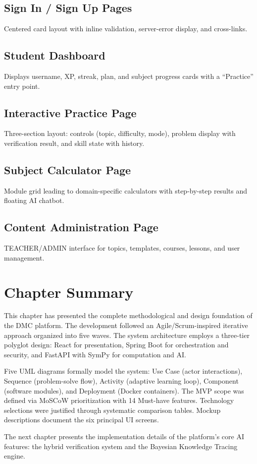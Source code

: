 \subsection{Sign In / Sign Up Pages} Centered card layout with inline validation, server-error display, and cross-links.

\subsection{Student Dashboard} Displays username, XP, streak, plan, and subject progress cards with a ``Practice'' entry point.

\subsection{Interactive Practice Page} Three-section layout: controls (topic, difficulty, mode), problem display with verification result, and skill state with history.

\subsection{Subject Calculator Page} Module grid leading to domain-specific calculators with step-by-step results and floating AI chatbot.

\subsection{Content Administration Page} TEACHER/ADMIN interface for topics, templates, courses, lessons, and user management.



\section{Chapter Summary}
\label{sec:ch5-summary}

This chapter has presented the complete methodological and design foundation of the DMC platform. The development followed an Agile/Scrum-inspired iterative approach organized into five waves. The system architecture employs a three-tier polyglot design: React for presentation, Spring Boot for orchestration and security, and FastAPI with SymPy for computation and AI.

Five UML diagrams formally model the system: Use Case (actor interactions), Sequence (problem-solve flow), Activity (adaptive learning loop), Component (software modules), and Deployment (Docker containers). The MVP scope was defined via MoSCoW prioritization with 14 Must-have features. Technology selections were justified through systematic comparison tables. Mockup descriptions document the six principal UI screens.

The next chapter presents the implementation details of the platform's core AI features: the hybrid verification system and the Bayesian Knowledge Tracing engine.
